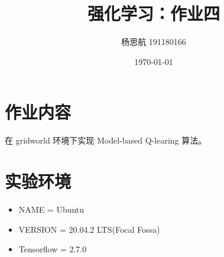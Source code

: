 \documentclass[a4paper,12pt]{article}
\begin{document}
\title{强化学习：作业四}

\author{杨思航 191180166}

\date{\today}

\maketitle

\section{作业内容}
在 gridworld 环境下实现 Model-based Q-learing 算法。

\section{实验环境}
\begin{itemize}
    \item NAME = Ubuntu
    \item VERSION = 20.04.2 LTS(Focal Fossa)
    \item Tensorflow = 2.7.0
\end{itemize}
\end{document}
